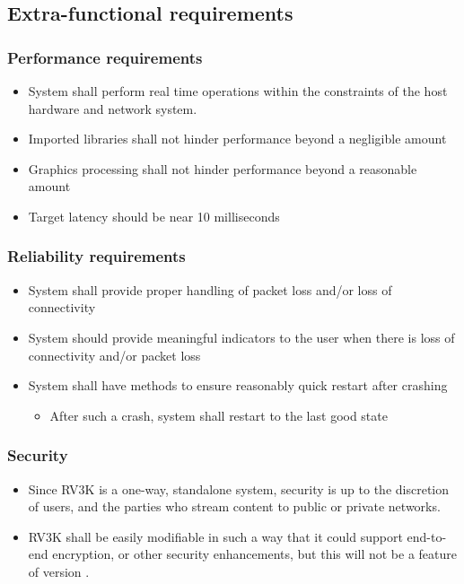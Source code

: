 \subsection{Extra-functional requirements}



\subsubsection{Performance requirements }


\begin{itemize}
\item System shall perform real time operations within the constraints of the host hardware and network system. 
\item Imported libraries shall not hinder performance beyond a negligible amount
\item Graphics processing shall not hinder performance beyond a reasonable amount
\item Target latency should be near 10 milliseconds

\hfill \initBox
\end{itemize}
 
\subsubsection{Reliability requirements}
\begin{itemize}
\item System shall provide proper handling of packet loss and/or loss of connectivity
\item System should provide meaningful indicators to the user when there is loss of connectivity and/or packet loss
\item System shall have methods to ensure reasonably quick restart after crashing
\begin{itemize}
\item After such a crash, system shall restart to the last good state
\end{itemize}
\end{itemize}

\hfill \initBox

\subsubsection{Security}
\begin{itemize}
\item Since RV3K is a one-way, standalone system, security is up to the discretion of users, and the parties who stream content to public or private networks.
\item RV3K shall be easily modifiable in such a way that it could support end-to-end encryption, or other security enhancements, but this will not be a feature of version \version.
\end{itemize}
\medskip

